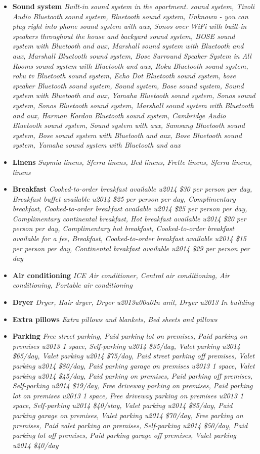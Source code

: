 \begin{itemize}
	\item \textbf{Sound system} \textrightarrow \textit{Built-in sound system in the apartment. sound system, Tivoli Audio Bluetooth sound system, Bluetooth sound system, Unknown - you can plug right into phone sound system with aux, Sonos over WiFi with built-in speakers throughout the house and backyard sound system, BOSE sound system with Bluetooth and aux, Marshall  sound system with Bluetooth and aux, Marshall  Bluetooth sound system, Bose Surround Speaker System in All Rooms sound system with Bluetooth and aux, Roku Bluetooth sound system, roku tv Bluetooth sound system, Echo Dot Bluetooth sound system, bose speaker Bluetooth sound system, Sound system, Bose sound system, Sound system with Bluetooth and aux, Yamaha Bluetooth sound system, Sonos sound system, Sonos Bluetooth sound system, Marshall sound system with Bluetooth and aux, Harman Kardon Bluetooth sound system, Cambridge Audio Bluetooth sound system, Sound system with aux, Samsung Bluetooth sound system, Bose sound system with Bluetooth and aux, Bose Bluetooth sound system, Yamaha sound system with Bluetooth and aux}
	\item \textbf{Linens} \textrightarrow \textit{Supmia linens, Sferra  linens, Bed linens, Frette linens, Sferra linens,  linens}
	\item \textbf{Breakfast} \textrightarrow \textit{Cooked-to-order breakfast available u2014 \$30 per person per day, Breakfast buffet available u2014 \$25 per person per day, Complimentary breakfast, Cooked-to-order breakfast available u2014 \$25 per person per day, Complimentary continental breakfast, Hot breakfast available u2014 \$20 per person per day, Complimentary hot breakfast, Cooked-to-order breakfast available for a fee, Breakfast, Cooked-to-order breakfast available u2014 \$15 per person per day, Continental breakfast available u2014 \$29 per person per day}
	\item \textbf{Air conditioning} \textrightarrow \textit{ICE Air conditioner, Central air conditioning, Air conditioning, Portable air conditioning}
	\item \textbf{Dryer} \textrightarrow \textit{Dryer, Hair dryer, Dryer u2013u00a0In unit, Dryer u2013 In building}
	\item \textbf{Extra pillows} \textrightarrow \textit{Extra pillows and blankets, Bed sheets and pillows}
	\item \textbf{Parking} \textrightarrow \textit{Free street parking, Paid parking lot on premises, Paid parking on premises u2013 1 space, Self-parking u2014 \$35/day, Valet parking u2014 \$65/day, Valet parking u2014 \$75/day, Paid street parking off premises, Valet parking u2014 \$80/day, Paid parking garage on premises u2013 1 space, Valet parking u2014 \$45/day, Paid parking on premises, Paid parking off premises, Self-parking u2014 \$19/day, Free driveway parking on premises, Paid parking lot on premises u2013 1 space, Free driveway parking on premises u2013 1 space, Self-parking u2014 \$40/stay, Valet parking u2014 \$85/day, Paid parking garage on premises, Valet parking u2014 \$70/day, Free parking on premises, Paid valet parking on premises, Self-parking u2014 \$50/day, Paid parking lot off premises, Paid parking garage off premises, Valet parking u2014 \$40/day}

\end{itemize}
